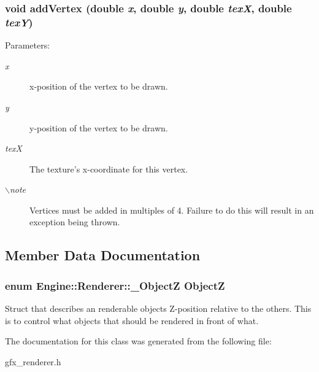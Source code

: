 \subsubsection{\setlength{\rightskip}{0pt plus 5cm}void addVertex (double {\em x}, double {\em y}, double {\em texX}, double {\em texY})}\label{classEngine_1_1Renderer_41f3f43242421530c19bc757a2c8a75e}


\begin{Desc}
\item[Parameters:]
\begin{description}
\item[{\em x}]x-position of the vertex to be drawn. \item[{\em y}]y-position of the vertex to be drawn. \item[{\em texX}]The texture's x-coordinate for this vertex. \item[{\em $\backslash$note}]Vertices must be added in multiples of 4. Failure to do this will result in an exception being thrown. \end{description}
\end{Desc}


\subsection{Member Data Documentation}
\subsubsection{\setlength{\rightskip}{0pt plus 5cm}enum {\bf Engine::Renderer::\_\-ObjectZ}  {\bf ObjectZ}}\label{classEngine_1_1Renderer_7c6b26b0da0ff88381daa002200cfa86}


Struct that describes an renderable objects Z-position relative to the others. This is to control what objects that should be rendered in front of what. 

The documentation for this class was generated from the following file:\begin{CompactItemize}
\item 
gfx\_\-renderer.h\end{CompactItemize}
